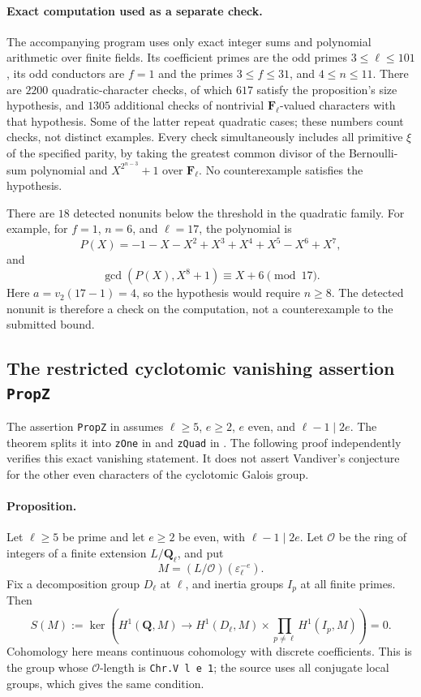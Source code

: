 \documentclass[11pt,a4paper]{article}
\theoremstyle{remark}
\newcommand{\src}[1]{\cite{#1}}
\begin{document}
\paragraph{Exact computation used as a separate check.}
The accompanying program  uses only exact
integer sums and polynomial arithmetic over finite fields.  Its
coefficient primes are the odd primes $3\leq\ell\leq101$, its odd
conductors are $f=1$ and the primes $3\leq f\leq31$, and
$4\leq n\leq11$.  There are $2200$ quadratic-character checks,
of which $617$ satisfy the proposition's size hypothesis, and
$1305$ additional checks of nontrivial $\mathbf F_\ell$-valued
characters with that hypothesis.  Some of the latter repeat
quadratic cases; these numbers count checks, not distinct examples.
Every check simultaneously includes all primitive $\xi$ of the
specified parity, by taking the greatest common divisor of the
Bernoulli-sum polynomial and $X^{2^{n-3}}+1$ over $\mathbf F_\ell$.
No counterexample satisfies the hypothesis.

There are $18$ detected nonunits below the threshold in the quadratic
family.  For example, for $f=1$, $n=6$, and $\ell=17$, the polynomial is
\[
 P(X)=-1-X-X^2+X^3+X^4+X^5-X^6+X^7,
\]
and
\[
 \gcd(P(X),X^8+1)\equiv X+6\pmod{17}.
\]
Here $a=v_2(17-1)=4$, so the hypothesis would require $n\geq8$.
The detected nonunit is therefore a check on the computation,
not a counterexample to the submitted bound.

\src{S-bernoulli-continued}

\subsection{The restricted cyclotomic vanishing assertion \texttt{PropZ}}

The assertion \texttt{PropZ} in
 assumes
$\ell\geq5$, $e\geq2$, $e$ even, and $\ell-1\mid2e$.
The theorem  splits it into
\texttt{zOne} in  and
\texttt{zQuad} in .
The following proof independently verifies this exact vanishing
statement.  It does not assert Vandiver's conjecture for the other
even characters of the cyclotomic Galois group.

\paragraph{Proposition.}
Let $\ell\geq5$ be prime and let $e\geq2$ be even, with
$\ell-1\mid2e$.  Let $\mathcal O$ be the ring of integers of a
finite extension $L/\mathbf Q_\ell$, and put
\[
 M=(L/\mathcal O)(\varepsilon_\ell^{-e}).
\]
Fix a decomposition group $D_\ell$ at $\ell$, and inertia groups
$I_p$ at all finite primes.  Then
\[
 S(M):=\ker\left(H^1(\mathbf Q,M)\longrightarrow
       H^1(D_\ell,M)\times\prod_{p\ne\ell}H^1(I_p,M)\right)=0.
\]
Cohomology here means continuous cohomology with discrete coefficients.
This is the group whose $\mathcal O$-length is
\texttt{Chr.V l e 1}; the source uses all conjugate local groups,
which gives the same condition.
\end{document}
